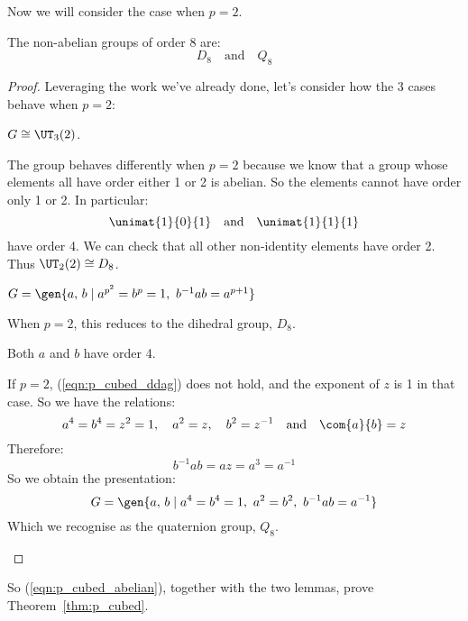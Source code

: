 Now we will consider the case when \(p = 2\).
\begin{lemma}
    The non-abelian groups of order 8 are:
    \[%
        D_8 \quad \text{and} \quad%
        Q_8
    \]
\end{lemma}

\begin{proof}
Leveraging the work we've already done, let's consider how the 3 cases behave when \(p=2\):

\begin{case}
    \item \(G \cong \UT_3(2)\).

        The group behaves differently when \(p = 2\) because we know that a group whose elements all have order either 1
        or 2 is abelian.
        So the elements cannot have order only 1 or 2.
        In particular:
        \[\unimat{1}{0}{1} \quad \text{and} \quad \unimat{1}{1}{1}\]
        have order 4.
        We can check that all other non-identity elements have order 2.
        Thus \(\UT_2(2) \cong D_8\).

    \item \(G = \gen{a,\,b \mid a^{p^2} = b^p = 1,\ b^{-1}ab = a^{p + 1}}\)

        When \(p = 2\), this reduces to the dihedral group, \(D_8\).

    \item Both \(a\) and \(b\) have order 4.

        If \(p = 2\), (\ref{eqn:p_cubed_ddag}) does not hold, and the exponent of \(z\) is 1 in that case.
        So we have the relations:
        \[a^4 = b^4 = z^2 = 1, \quad a^2 = z, \quad b^2 = z^{-1} \quad \text{and} \quad \com{a}{b} = z\]
        Therefore:
        \[b^{-1}ab = az = a^3 = a^{-1}\]
        So we obtain the presentation:
        \[G = \gen{a,\,b \mid a^4 = b^4 = 1,\ a^2 = b^2,\ b^{-1}ab = a^{-1}}\]
        Which we recognise as the quaternion group, \(Q_8\).
\end{case}
\end{proof}

So (\ref{eqn:p_cubed_abelian}), together with the two lemmas, prove Theorem~\ref{thm:p_cubed}.

